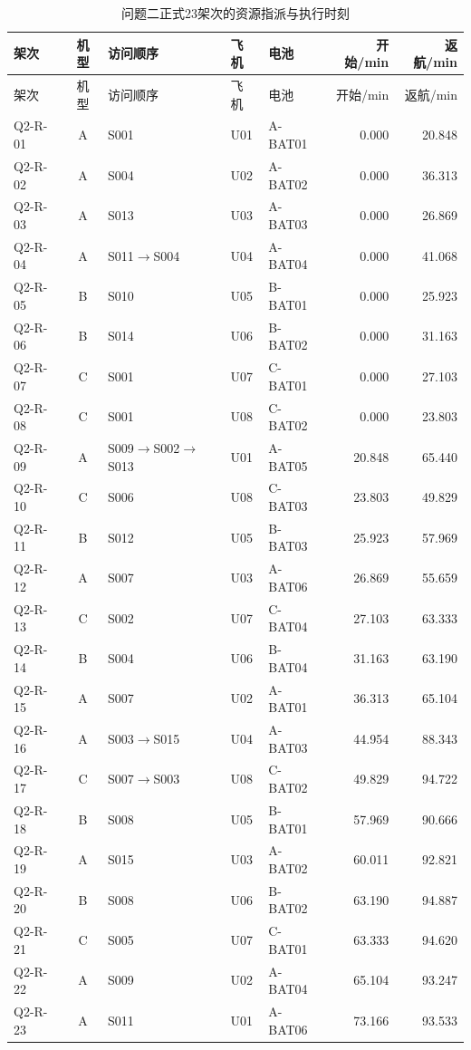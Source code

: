 \documentclass[withoutpreface,colorprint]{format}
\numberwithin{equation}{section}
\numberwithin{figure}{section}
\numberwithin{table}{section}
\begin{document}
\begin{longtable}{@{}lclllrr@{}}
\caption{问题二正式23架次的资源指派与执行时刻}\label{tab:q2_schedule}\\
\toprule
架次 & 机型 & 访问顺序 & 飞机 & 电池 & 开始/min & 返航/min\\
\midrule
\endfirsthead
\toprule
架次 & 机型 & 访问顺序 & 飞机 & 电池 & 开始/min & 返航/min\\
\midrule
\endhead
Q2-R-01 & A & S001 & U01 & A-BAT01 & 0.000 & 20.848\\
Q2-R-02 & A & S004 & U02 & A-BAT02 & 0.000 & 36.313\\
Q2-R-03 & A & S013 & U03 & A-BAT03 & 0.000 & 26.869\\
Q2-R-04 & A & S011$\to$S004 & U04 & A-BAT04 & 0.000 & 41.068\\
Q2-R-05 & B & S010 & U05 & B-BAT01 & 0.000 & 25.923\\
Q2-R-06 & B & S014 & U06 & B-BAT02 & 0.000 & 31.163\\
Q2-R-07 & C & S001 & U07 & C-BAT01 & 0.000 & 27.103\\
Q2-R-08 & C & S001 & U08 & C-BAT02 & 0.000 & 23.803\\
Q2-R-09 & A & S009$\to$S002$\to$S013 & U01 & A-BAT05 & 20.848 & 65.440\\
Q2-R-10 & C & S006 & U08 & C-BAT03 & 23.803 & 49.829\\
Q2-R-11 & B & S012 & U05 & B-BAT03 & 25.923 & 57.969\\
Q2-R-12 & A & S007 & U03 & A-BAT06 & 26.869 & 55.659\\
Q2-R-13 & C & S002 & U07 & C-BAT04 & 27.103 & 63.333\\
Q2-R-14 & B & S004 & U06 & B-BAT04 & 31.163 & 63.190\\
Q2-R-15 & A & S007 & U02 & A-BAT01 & 36.313 & 65.104\\
Q2-R-16 & A & S003$\to$S015 & U04 & A-BAT03 & 44.954 & 88.343\\
Q2-R-17 & C & S007$\to$S003 & U08 & C-BAT02 & 49.829 & 94.722\\
Q2-R-18 & B & S008 & U05 & B-BAT01 & 57.969 & 90.666\\
Q2-R-19 & A & S015 & U03 & A-BAT02 & 60.011 & 92.821\\
Q2-R-20 & B & S008 & U06 & B-BAT02 & 63.190 & 94.887\\
Q2-R-21 & C & S005 & U07 & C-BAT01 & 63.333 & 94.620\\
Q2-R-22 & A & S009 & U02 & A-BAT04 & 65.104 & 93.247\\
Q2-R-23 & A & S011 & U01 & A-BAT06 & 73.166 & 93.533\\
\bottomrule
\end{longtable}
\end{document}
